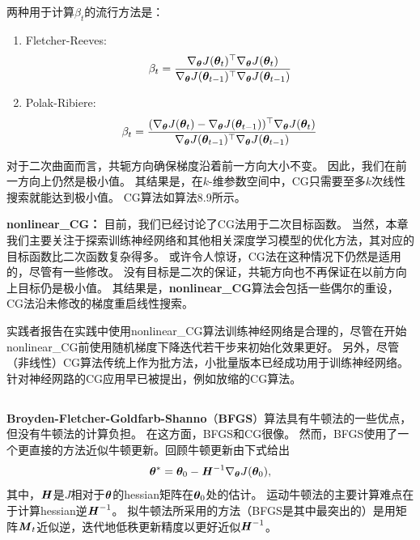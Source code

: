 两种用于计算$\beta_t$的流行方法是：
\begin{enumerate}
\item Fletcher-Reeves:
\begin{equation}
    \beta_t = \frac{ \nabla_{\boldsymbol{\theta}} J(\boldsymbol{\theta}_t)^\top \nabla_{\boldsymbol{\theta}} J(\boldsymbol{\theta}_t) }
{ \nabla_{\boldsymbol{\theta}} J(\boldsymbol{\theta}_{t-1})^\top \nabla_{\boldsymbol{\theta}} J(\boldsymbol{\theta}_{t-1}) }
\end{equation}

\item Polak-Ribiere:
\begin{equation}
    \beta_t = \frac{ (\nabla_{\boldsymbol{\theta}} J(\boldsymbol{\theta}_t) - \nabla_{\boldsymbol{\theta}} J(\boldsymbol{\theta}_{t-1}))^\top \nabla_{\boldsymbol{\theta}} J(\boldsymbol{\theta}_t) }
{ \nabla_{\boldsymbol{\theta}} J(\boldsymbol{\theta}_{t-1})^\top \nabla_{\boldsymbol{\theta}} J(\boldsymbol{\theta}_{t-1}) }
\end{equation}
\end{enumerate}
对于二次曲面而言，共轭方向确保梯度沿着前一方向大小不变。
因此，我们在前一方向上仍然是极小值。
其结果是，在$k$-维参数空间中，\gls{CG}只需要至多$k$次线性搜索就能达到极小值。
\gls{CG}算法如算法8.9所示。

\textbf{\gls{nonlinear_CG}：}
目前，我们已经讨论了\gls{CG}法用于二次目标函数。
当然，本章我们主要关注于探索训练神经网络和其他相关深度学习模型的优化方法，其对应的目标函数比二次函数复杂得多。
或许令人惊讶，\gls{CG}法在这种情况下仍然是适用的，尽管有一些修改。
没有目标是二次的保证，共轭方向也不再保证在以前方向上目标仍是极小值。
其结果是，\textbf{\gls{nonlinear_CG}}算法会包括一些偶尔的重设，\gls{CG}法沿未修改的梯度重启线性搜索。


实践者报告在实践中使用\gls{nonlinear_CG}算法训练神经网络是合理的，尽管在开始\gls{nonlinear_CG}前使用随机梯度下降迭代若干步来初始化效果更好。
另外，尽管（非线性）\gls{CG}算法传统上作为批方法，小批量版本已经成功用于训练神经网络\citep{LeRoux-chapter-2011}。
针对神经网路的\gls{CG}应用早已被提出，例如放缩的\gls{CG}算法\citep{Moller}。

\subsection{}
\label{sec:bfgs}
\textbf{Broyden-Fletcher-Goldfarb-Shanno}（\textbf{\gls{BFGS}}）算法具有牛顿法的一些优点，但没有牛顿法的计算负担。
在这方面，\gls{BFGS}和CG很像。
然而，\gls{BFGS}使用了一个更直接的方法近似牛顿更新。回顾牛顿更新由下式给出
\begin{equation}
    \boldsymbol{\theta}^* = \boldsymbol{\theta}_0 - \boldsymbol{\mathit{H}}^{-1} \nabla_{\boldsymbol{\theta}} J(\boldsymbol{\theta}_0),
\end{equation}
其中，$\boldsymbol{\mathit{H}}$是$J$相对于$\boldsymbol{\theta}$的\gls{hessian}矩阵在$\boldsymbol{\theta}_0$处的估计。
运动牛顿法的主要计算难点在于计算\gls{hessian}逆$\boldsymbol{\mathit{H}}^{-1}$。
拟牛顿法所采用的方法（\gls{BFGS}是其中最突出的）是用矩阵$\boldsymbol{\mathit{M}}_t$近似逆，迭代地低秩更新精度以更好近似$\boldsymbol{\mathit{H}}^{-1}$。


